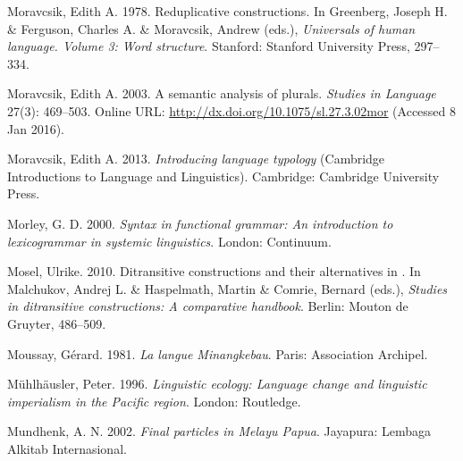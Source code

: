 \begin{styleCitaviBibliographyEntry}
Moravcsik, Edith A. 1978. Reduplicative constructions. In Greenberg, Joseph H. \& Ferguson, Charles A. \& Moravcsik, Andrew (eds.), \textit{Universals of human language. Volume 3: Word structure}. Stanford: Stanford University Press, 297–334.
\end{styleCitaviBibliographyEntry}

\begin{styleCitaviBibliographyEntry}
Moravcsik, Edith A. 2003. A semantic analysis of  plurals. \textit{Studies in Language} 27(3): 469–503. Online URL: \url{http://dx.doi.org/10.1075/sl.27.3.02mor} (Accessed 8 Jan 2016).
\end{styleCitaviBibliographyEntry}

\begin{styleCitaviBibliographyEntry}
Moravcsik, Edith A. 2013. \textit{Introducing language typology} (Cambridge Introductions to Language and Linguistics). Cambridge: Cambridge University Press.
\end{styleCitaviBibliographyEntry}

\begin{styleCitaviBibliographyEntry}
Morley, G. D. 2000. \textit{Syntax in functional grammar: An introduction to lexicogrammar in systemic linguistics}. London: Continuum.
\end{styleCitaviBibliographyEntry}

\begin{styleCitaviBibliographyEntry}
Mosel, Ulrike. 2010. Ditransitive constructions and their alternatives in . In Malchukov, Andrej L. \& Haspelmath, Martin \& Comrie, Bernard (eds.), \textit{Studies in ditransitive constructions: A comparative handbook}. Berlin: Mouton de Gruyter, 486–509.
\end{styleCitaviBibliographyEntry}

\begin{styleCitaviBibliographyEntry}
Moussay, Gérard. 1981. \textit{La langue Minangkebau}. Paris: Association Archipel.
\end{styleCitaviBibliographyEntry}

\begin{styleCitaviBibliographyEntry}
Mühlhäusler, Peter. 1996. \textit{Linguistic ecology: Language change and linguistic imperialism in the Pacific region}. London: Routledge.
\end{styleCitaviBibliographyEntry}

\begin{styleCitaviBibliographyEntry}
Mundhenk, A. N. 2002. \textit{Final particles in Melayu Papua}. Jayapura: Lembaga Alkitab Internasional.
\end{styleCitaviBibliographyEntry}


